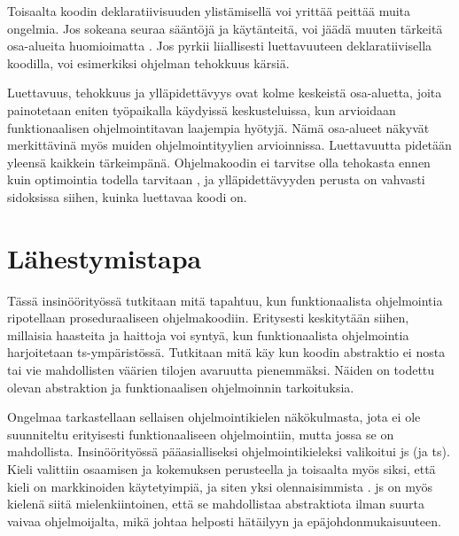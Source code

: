 Toisaalta koodin deklaratiivisuuden ylistämisellä voi yrittää peittää muita ongelmia. Jos sokeana seuraa sääntöjä ja käytänteitä, voi jäädä muuten tärkeitä osa-alueita huomioimatta \cite{functional_fixedness}. Jos pyrkii liiallisesti luettavuuteen deklaratiivisella koodilla, voi esimerkiksi ohjelman tehokkuus kärsiä.

Luettavuus, tehokkuus ja ylläpidettävyys ovat kolme keskeistä osa-aluetta, joita painotetaan eniten työpaikalla käydyissä keskusteluissa, kun arvioidaan funktionaalisen ohjelmointitavan laajempia hyötyjä. Nämä osa-alueet näkyvät merkittävinä myös muiden ohjelmointityylien arvioinnissa. Luettavuutta pidetään yleensä kaikkein tärkeimpänä. Ohjelmakoodin ei tarvitse olla tehokasta ennen kuin optimointia todella tarvitaan \cite{prematureoptimization}, ja ylläpidettävyyden perusta on vahvasti sidoksissa siihen, kuinka luettavaa koodi on.


\section{Lähestymistapa}

Tässä insinöörityössä tutkitaan mitä tapahtuu, kun funktionaalista ohjelmointia ripotellaan proseduraaliseen ohjelmakoodiin. Eritysesti keskitytään siihen, millaisia haasteita ja haittoja voi syntyä, kun funktionaalista ohjelmointia harjoitetaan \gls{ts}-ympäristössä. Tutkitaan mitä käy kun koodin abstraktio ei nosta  tai vie mahdollisten väärien tilojen avaruutta pienemmäksi. Näiden on todettu olevan abstraktion ja funktionaalisen ohjelmoinnin tarkoituksia. \citep{dijkstra_humble_programmer,impossiblebetter}

Ongelmaa tarkastellaan sellaisen ohjelmointikielen näkökulmasta, jota ei ole suunniteltu erityisesti funktionaaliseen ohjelmointiin, mutta jossa se on mahdollista. Insinöörityössä pääasialliseksi ohjelmointikieleksi valikoitui \gls{js} (ja \gls{ts}). Kieli valittiin osaamisen ja kokemuksen perusteella ja toisaalta myös siksi, että kieli on markkinoiden käytetyimpiä, ja siten yksi olennaisimmista \cite{pypl:lang}. \Gls{js} on myös kielenä siitä mielenkiintoinen, että se mahdollistaa abstraktiota ilman suurta vaivaa ohjelmoijalta, mikä johtaa helposti hätäilyyn ja epäjohdonmukaisuuteen.

